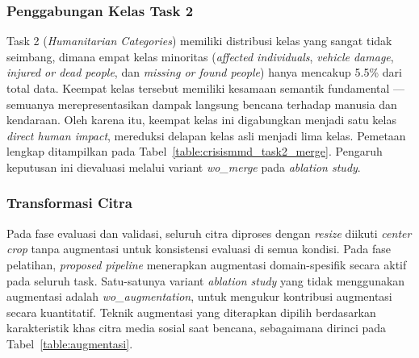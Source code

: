 \subsubsection{Penggabungan Kelas Task 2}
Task 2 (\textit{Humanitarian Categories}) memiliki distribusi kelas yang
sangat tidak seimbang, dimana empat kelas minoritas (\textit{affected
individuals}, \textit{vehicle damage}, \textit{injured or dead people},
dan \textit{missing or found people}) hanya mencakup 5.5\% dari total
data. Keempat kelas tersebut memiliki kesamaan semantik fundamental —
semuanya merepresentasikan dampak langsung bencana terhadap manusia dan
kendaraan. Oleh karena itu, keempat kelas ini digabungkan menjadi satu
kelas \textit{direct human impact}, mereduksi delapan kelas asli menjadi
lima kelas. Pemetaan lengkap ditampilkan pada
Tabel~\ref{table:crisismmd_task2_merge}. Pengaruh keputusan ini
dievaluasi melalui variant \textit{wo\_merge} pada \textit{ablation
study}. \par

\subsubsection{Transformasi Citra}
Pada fase evaluasi dan validasi, seluruh citra diproses dengan
\textit{resize} diikuti \textit{center crop} tanpa augmentasi untuk
konsistensi evaluasi di semua kondisi. Pada fase pelatihan,
\textit{proposed pipeline} menerapkan augmentasi domain-spesifik secara
aktif pada seluruh task. Satu-satunya variant \textit{ablation study}
yang tidak menggunakan augmentasi adalah \textit{wo\_augmentation},
untuk mengukur kontribusi augmentasi secara kuantitatif. Teknik
augmentasi yang diterapkan dipilih berdasarkan karakteristik khas citra
media sosial saat bencana, sebagaimana dirinci pada
Tabel~\ref{table:augmentasi}. \par

